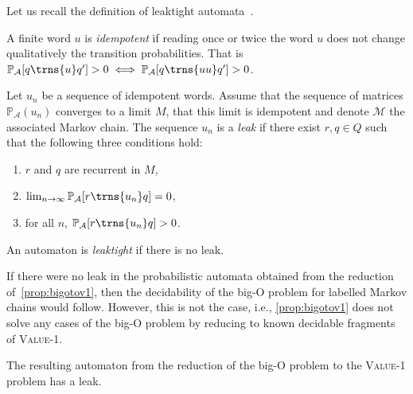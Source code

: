 \documentclass[10pt,a4paper]{amsart}
\numberwithin{equation}{section}
\theoremstyle{plain}
\theoremstyle{definition}
\theoremstyle{remark}
\newcommand\pr{\mathbb{P}}
\newcommand\pa{\mathcal{A}}
\begin{document}
Let us recall the definition of leaktight automata~\cite{oualhadj2015deciding}.

\begin{defi}
A finite word $u$ is \emph{idempotent} if reading once or twice the word $u$ does not change qualitatively the transition probabilities. That is $\pr_\pa[q \trns{u} q'] > 0 \iff \pr_\pa[q \trns{uu} q'] > 0 $.

Let $u_n$ be a sequence of idempotent words.  Assume that the sequence of matrices $\pr_\pa(u_n)$ converges to a limit $M$, that this limit is idempotent and denote $\mathcal M$ the associated Markov chain. The sequence $u_n$ is a \textit{leak} if there exist $r, q\in Q$ such that the following three conditions hold:
\begin{enumerate}
\item $r$ and $q$ are recurrent in $M$, \item $\lim_{n \to \infty} \pr_\pa[r \trns{u_n} q] = 0$, \item for all $n$, $\pr_\pa[r \trns{u_n} q]>0$.
\end{enumerate}
An automaton is \emph{leaktight} if there is no leak.
\end{defi}

If there were no leak in the probabilistic automata obtained from the reduction
of~\cref{prop:bigotov1}, then the decidability  of the big-O problem for labelled Markov
chains would follow. However, this is not the case, i.e., \cref{prop:bigotov1} does not solve any cases of the big-O problem by reducing to known decidable fragments of \textsc{Value-1}.

\begin{prop}
\label{ex:leak}
The resulting automaton from the reduction of the big-O problem to the \textsc{Value-1} problem has a leak.
\end{prop}
\end{document}
